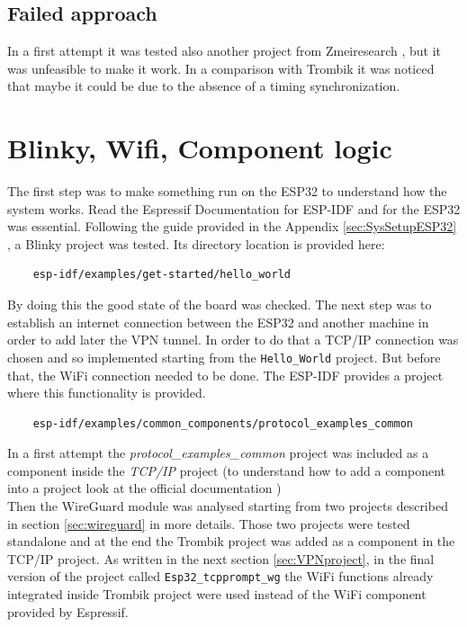 \subsection{Failed approach}
In a first attempt it was tested also another project from Zmeiresearch \cite{wg_zmeiresearch}, but it was unfeasible to make it work. In a comparison with Trombik it was noticed that maybe it could be due to the absence of a timing synchronization. 

\section{Blinky, Wifi, Component logic}
The first step was to make something run on the ESP32 to understand how the system works. Read the Espressif Documentation for ESP-IDF and for the ESP32 was essential.
Following the guide provided in the Appendix \ref{sec:SysSetupESP32} , a Blinky project was tested. Its directory location is provided here:
\begin{lstlisting}
    esp-idf/examples/get-started/hello_world
\end{lstlisting} 

By doing this the good state of the board was checked.
The next step was to establish an internet connection between the ESP32 and another machine in order to add later the VPN tunnel.
In order to do that a TCP/IP connection was chosen and so implemented starting from the \texttt{Hello\_World} project.
But before that, the WiFi connection needed to be done. The ESP-IDF provides a project where this functionality is provided.
\begin{lstlisting}
    esp-idf/examples/common_components/protocol_examples_common
\end{lstlisting}

In a first attempt the \textit{protocol\_examples\_common} project was included as a component inside the \textit{TCP/IP} project (to understand how to add a component into a project look at the official documentation \cite{ESPcomponents})
\\Then the WireGuard module was analysed starting from two projects described in section \ref{sec:wireguard} in more details. Those two projects were tested standalone and at the end
the Trombik\cite{wg_trombik} project was added as a component in the TCP/IP project. As written in the next section \ref{sec:VPNproject}, in the final version of the project called \texttt{Esp32\_tcpprompt\_wg} the WiFi functions already integrated inside Trombik project were used instead of the WiFi component provided by Espressif. 

